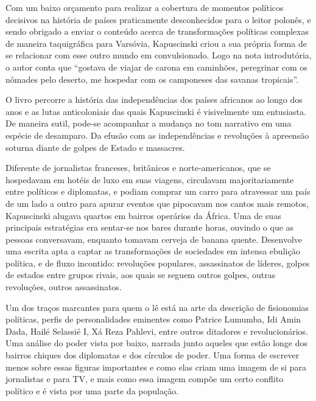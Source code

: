 Com um baixo orçamento para realizar a cobertura de momentos políticos
decisivos na história de países praticamente desconhecidos para o leitor
polonês, e sendo obrigado a enviar o conteúdo acerca de transformações
políticas complexas de maneira taquigráfica para Varsóvia, Kapuscinski
criou a sua própria forma de se relacionar com esse outro mundo em
convulsionado. Logo na nota introdutória, o autor conta que ``gostava de
viajar de carona em caminhões, peregrinar com os nômades pelo deserto,
me hospedar com os camponeses das savanas tropicais''.

O livro percorre a história das independências dos países africanos ao
longo dos anos e as lutas anticoloniais das quais Kapuscinski é
visivelmente um entusiasta. De maneira sutil, pode-se acompanhar a
mudança no tom narrativo em uma espécie de desamparo. Da efusão com as
independências e revoluções à apreensão soturna diante de golpes de
Estado e massacres.

Diferente de jornalistas franceses, britânicos e norte-americanos, que
se hospedavam em hotéis de luxo em suas viagens, circulavam
majoritariamente entre políticos e diplomatas, e podiam comprar um carro
para atravessar um país de um lado a outro para apurar eventos que
pipocavam nos cantos mais remotos, Kapuscinski alugava quartos em
bairros operários da África. Uma de suas principais estratégias era
sentar-se nos bares durante horas, ouvindo o que as pessoas conversavam,
enquanto tomavam cerveja de banana quente. Desenvolve uma escrita apta a
captar as transformações de sociedades em intensa ebulição política, e
de fluxo incontido: revoluções populares, assassinatos de líderes,
golpes de estados entre grupos rivais, aos quais se seguem outros
golpes, outras revoluções, outros assassinatos.

Um dos traços marcantes para quem o lê está na arte da descrição de
fisionomias políticas, perfis de personalidades eminentes como Patrice
Lumumba, Idi Amin Dada, Hailé Selassié I, Xá Reza Pahlevi, entre outros
ditadores e revolucionários. Uma análise do poder vista por baixo,
narrada junto aqueles que estão longe dos bairros chiques dos diplomatas
e dos círculos de poder. Uma forma de escrever menos sobre essas figuras
importantes e como elas criam uma imagem de si para jornalistas e para
TV, e mais como essa imagem compõe um certo conflito político e é vista
por uma parte da população.

